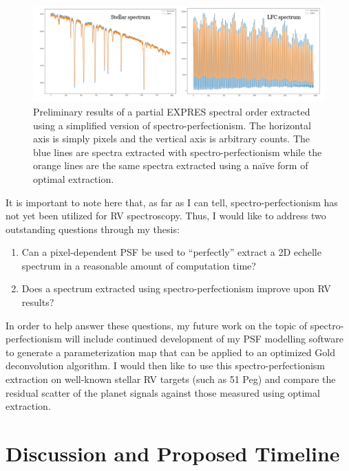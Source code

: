 \documentclass[11pt]{article}
\begin{document}
\begin{figure}
    \centering
    \includegraphics[width=\textwidth]{images/sp_test.png}
    \caption{Preliminary results of a partial EXPRES spectral order extracted using a simplified version of spectro-perfectionism. The horizontal axis is simply pixels and the vertical axis is arbitrary counts. The blue lines are spectra extracted with spectro-perfectionism while the orange lines are the same spectra extracted using a na\"ive form of optimal extraction.}
    \label{fig:sp_test}
\end{figure}

It is important to note here that, as far as I can tell, spectro-perfectionism has not yet been utilized for RV spectroscopy. Thus, I would like to address two outstanding questions through my thesis:
\begin{enumerate}
    \item Can a pixel-dependent PSF be used to ``perfectly'' extract a 2D echelle spectrum in a reasonable amount of computation time?
    \item Does a spectrum extracted using spectro-perfectionism improve upon RV results?
\end{enumerate}
In order to help answer these questions, my future work on the topic of spectro-perfectionism will include continued development of my PSF modelling software to generate a parameterization map that can be applied to an optimized Gold deconvolution algorithm. I would then like to use this spectro-perfectionism extraction on well-known stellar RV targets (such as 51 Peg) and compare the residual scatter of the planet signals against those measured using optimal extraction.

\section{Discussion and Proposed Timeline}
\end{document}
